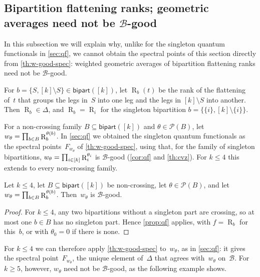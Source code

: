 \documentclass[11pt,letterpaper]{article}
\DeclareMathOperator{\tensorrank}{R}
\newcommand{\bipart}{\mathsf{bipart}}
\begin{document}
\subsection{Bipartition flattening ranks; geometric averages need not be \texorpdfstring{$\mathcal{B}$}{B}-good}\label{sec:upper-main}

In this subsection we will explain why, unlike for the singleton quantum functionals in \cref{sec:qf}, we cannot obtain the spectral points of this section directly from \cref{th:w-good-spec}: weighted geometric averages of bipartition flattening ranks need not be $\mathcal{B}$-good.

For $b = \{S, [k] \setminus S\} \in \bipart([k])$, let $\tensorrank_b(t)$ be the rank of the flattening of~$t$ that groups the legs in~$S$ into one leg and the legs in $[k] \setminus S$ into another. Then $\tensorrank_b \in \Delta$, and $\tensorrank_b = \tensorrank_i$ for the singleton bipartition $b = \{\{i\}, [k] \setminus \{i\}\}$. 

For a non-crossing family $B \subseteq \bipart([k])$ and $\theta \in \mathcal{P}(B)$, let $w_\theta = \prod_{b \in B} \tensorrank_b^{\smash[t]{\theta(b)}}$.
In \cref{sec:qf} we obtained the singleton quantum functionals as the spectral points~$F_{w_\theta}$ of \cref{th:w-good-spec}, using that, for the family of singleton bipartitions, $w_\theta = \prod_{i \in [k]} \tensorrank_i^{\smash[t]{\theta_i}}$ is $\mathcal{B}$-good (\cref{cor:qf} and \cref{th:cvz}). 
For $k \leq 4$ this extends to every non-crossing family.

\begin{proposition}\label{prop:upper-small-k}
Let $k \leq 4$, let $B \subseteq \bipart([k])$ be non-crossing, let $\theta \in \mathcal{P}(B)$, and let $w_\theta = \prod_{b \in B} \tensorrank_b^{\smash[t]{\theta(b)}}$. Then~$w_\theta$ is $\mathcal{B}$-good.
\end{proposition}
\begin{proof}
For $k \leq 4$, any two bipartitions without a singleton part are crossing, so at most one $b \in B$ has no singleton part. Hence \cref{prop:qf} applies, with $f = \tensorrank_b$ for this~$b$, or with $\theta_0 = 0$ if there is none.
\end{proof}

For $k \leq 4$ we can therefore apply \cref{th:w-good-spec} to~$w_\theta$, as in \cref{sec:qf}: it gives the spectral point~$F_{w_\theta}$, the unique element of~$\Delta$ that agrees with~$w_\theta$ on~$\mathcal{B}$. For $k \geq 5$, however, $w_\theta$ need not be $\mathcal{B}$-good, as the following example shows. 
\end{document}
